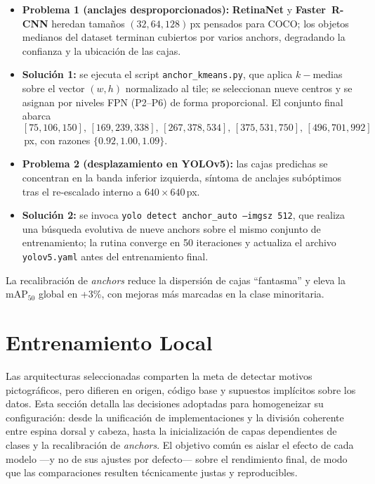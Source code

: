 \begin{itemize}
   \item \textbf{Problema 1 (anclajes desproporcionados):} \textbf{RetinaNet} y \textbf{Faster~R-CNN} heredan tamaños \((32, 64, 128)\)\,px pensados para COCO; los objetos medianos del dataset terminan cubiertos por varios anchors, degradando la confianza y la ubicación de las cajas.
   \item \textbf{Solución 1:} se ejecuta el script \texttt{anchor\_kmeans.py}, que aplica \(k\!\!-\!\)medias sobre el vector \((w,h)\) normalizado al tile; se seleccionan nueve centros y se asignan por niveles FPN (P2–P6) de forma proporcional.
         El conjunto final abarca \([75,106,150],\,[169,239,338],\,[267,378,534],\,[375,531,750],\,[496,701,992]\)\,px, con razones \(\{0.92,1.00,1.09\}\).
   \item \textbf{Problema 2 (desplazamiento en YOLOv5):} las cajas predichas se concentran en la banda inferior izquierda, síntoma de anclajes subóptimos tras el re-escalado interno a \(640\times640\)\,px.
   \item \textbf{Solución 2:} se invoca \texttt{yolo detect anchor\_auto --imgsz 512}, que realiza una búsqueda evolutiva de nueve anchors sobre el mismo conjunto de entrenamiento; la rutina converge en 50 iteraciones y actualiza el archivo \texttt{yolov5.yaml} antes del entrenamiento final.
\end{itemize}

La recalibración de \emph{anchors} reduce la dispersión de cajas “fantasma” y eleva la \(\text{mAP}_{50}\) global en +3\%, con mejoras más marcadas en la clase minoritaria.

\section{Entrenamiento Local}\label{sec:entrenamiento_local}

Las arquitecturas seleccionadas comparten la meta de detectar motivos pictográficos, pero difieren en origen, código base y supuestos implícitos sobre los datos.
Esta sección detalla las decisiones adoptadas para homogeneizar su configuración: desde la unificación de implementaciones y la división coherente entre espina dorsal y cabeza, hasta la inicialización de capas dependientes de clases y la recalibración de \emph{anchors}.
El objetivo común es aislar el efecto de cada modelo —y no de sus ajustes por defecto— sobre el rendimiento final, de modo que las comparaciones resulten técnicamente justas y reproducibles.

